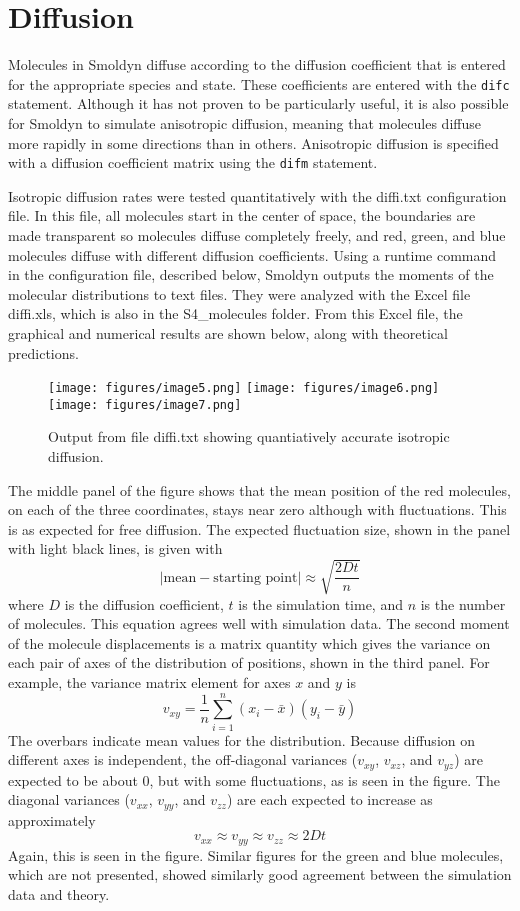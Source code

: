 \documentclass {scrbook}
\newcommand {\ttt} {\texttt}
\begin{document}
\section{Diffusion}

Molecules in Smoldyn diffuse according to the diffusion coefficient that is entered for the appropriate species and state. These coefficients are entered with the \ttt{difc} statement. Although it has not proven to be particularly useful, it is also possible for Smoldyn to simulate anisotropic diffusion, meaning that molecules diffuse more rapidly in some directions than in others. Anisotropic diffusion is specified with a diffusion coefficient matrix using the \ttt{difm} statement.

Isotropic diffusion rates were tested quantitatively with the diffi.txt configuration file. In this file, all molecules start in the center of space, the boundaries are made transparent so molecules diffuse completely freely, and red, green, and blue molecules diffuse with different diffusion coefficients. Using a runtime command in the configuration file, described below, Smoldyn outputs the moments of the molecular distributions to text files. They were analyzed with the Excel file diffi.xls, which is also in the S4\_molecules folder. From this Excel file, the graphical and numerical results are shown below, along with theoretical predictions.

\begin{figure}[h]
\centering
\texttt{[image: figures/image5.png]}
\texttt{[image: figures/image6.png]}
\texttt{[image: figures/image7.png]}
\caption{Output from file diffi.txt showing quantiatively accurate isotropic diffusion.}
\label{fig:diffi}
\end{figure}

The middle panel of the figure shows that the mean position of the red molecules, on each of the three coordinates, stays near zero although with fluctuations. This is as expected for free diffusion. The expected fluctuation size, shown in the panel with light black lines, is given with
$$|\textrm{mean}-\textrm{starting point}| \approx \sqrt{\frac{2Dt}{n}}$$
where $D$ is the diffusion coefficient, $t$ is the simulation time, and $n$ is the number of molecules. This equation agrees well with simulation data. The second moment of the molecule displacements is a matrix quantity which gives the variance on each pair of axes of the distribution of positions, shown in the third panel. For example, the variance matrix element for axes $x$ and $y$ is
$$v_{xy} = \frac{1}{n} \sum_{i=1}^{n} (x_i - \bar{x})(y_i - \bar{y})$$
The overbars indicate mean values for the distribution. Because diffusion on different axes is independent, the off-diagonal variances ($v_{xy}$, $v_{xz}$, and $v_{yz}$) are expected to be about 0, but with some fluctuations, as is seen in the figure. The diagonal variances ($v_{xx}$, $v_{yy}$, and $v_{zz}$) are each expected to increase as approximately
$$v_{xx} \approx v_{yy} \approx v_{zz} \approx 2Dt$$
Again, this is seen in the figure. Similar figures for the green and blue molecules, which are not presented, showed similarly good agreement between the simulation data and theory.
\end{document}
